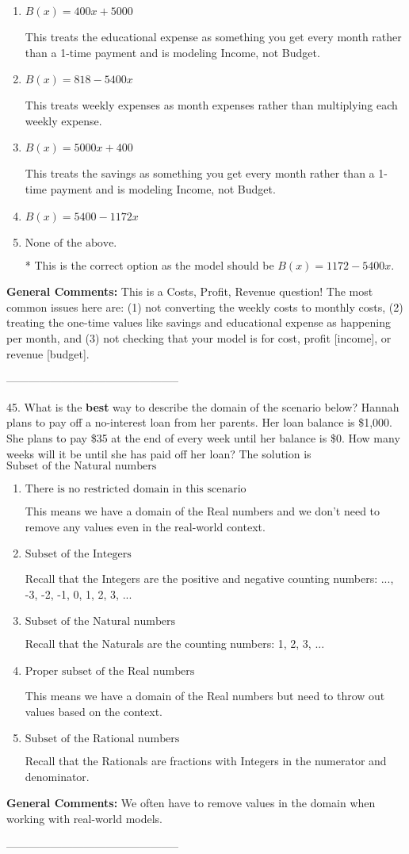 \documentclass{extbook}[14pt]
\begin{document}
\begin{enumerate}[label=\Alph*.] 
\item $ B(x) = 400 x + 5000 $ 

 This treats the educational expense as something you get every month rather than a 1-time payment and is modeling Income, not Budget. 
\item $ B(x) = 818 - 5400 x $ 

 This treats weekly expenses as month expenses rather than multiplying each weekly expense. 
\item $ B(x) = 5000 x + 400 $ 

 This treats the savings as something you get every month rather than a 1-time payment and is modeling Income, not Budget. 
\item $ B(x) = 5400 - 1172 x $ 

  
\item $ \text{None of the above.} $ 

 * This is the correct option as the model should be $B(x) = 1172 - 5400 x$. 
\end{enumerate} 
 
\textbf{General Comments:} This is a Costs, Profit, Revenue question! The most common issues here are: (1) not converting the weekly costs to monthly costs, (2) treating the one-time values like savings and educational expense as happening per month, and (3) not checking that your model is for cost, profit [income], or revenue [budget].

-----------------------------------------------

45. What is the \textbf{best} way to describe the domain of the scenario below?
Hannah plans to pay off a no-interest loan from her parents. Her loan balance is \$1,000. She plans to pay \$35 at the end of every week until her balance is \$0. How many weeks will it be until she has paid off her loan? 
The solution is $ \text{Subset of the Natural numbers} $ 

\begin{enumerate}[label=\Alph*.] 
\item $ \text{There is no restricted domain in this scenario} $ 

 This means we have a domain of the Real numbers and we don't need to remove any values even in the real-world context. 
\item $ \text{Subset of the Integers} $ 

 Recall that the Integers are the positive and negative counting numbers: ..., -3, -2, -1, 0, 1, 2, 3, ...  
\item $ \text{Subset of the Natural numbers} $ 

 Recall that the Naturals are the counting numbers: 1, 2, 3, ... 
\item $ \text{Proper subset of the Real numbers} $ 

 This means we have a domain of the Real numbers but need to throw out values based on the context. 
\item $ \text{Subset of the Rational numbers} $ 

 Recall that the Rationals are fractions with Integers in the numerator and denominator. 
\end{enumerate} 
 
\textbf{General Comments:} We often have to remove values in the domain when working with real-world models.

-----------------------------------------------
\end{document}
